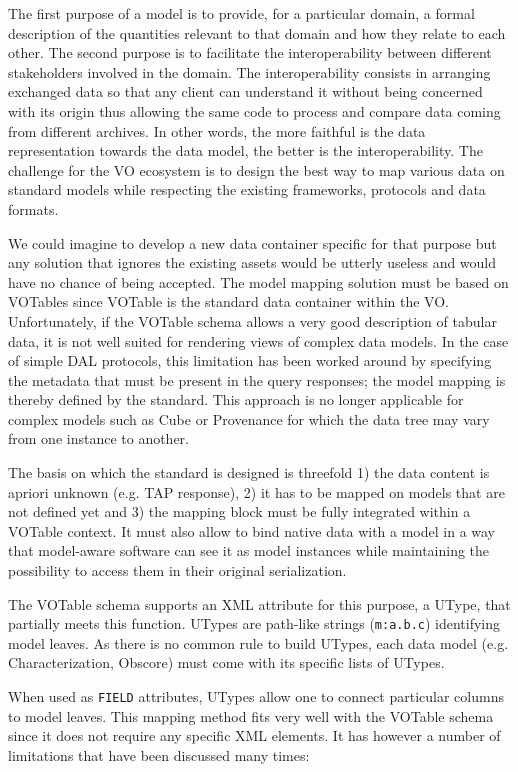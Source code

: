 
The first purpose of a model is to provide, for a particular domain, a formal description of the quantities relevant to that domain and how they relate to each other.
The second purpose is to facilitate the interoperability between  different stakeholders involved in the domain. The interoperability consists in arranging exchanged data 
so that any client can understand it without being concerned with its origin thus allowing the same code to process and compare data coming from different archives.  
In other words, the more faithful is the data representation towards the data model, the better is the interoperability.
The challenge for the VO ecosystem is to design the best way to map various data on standard models while respecting the existing frameworks, protocols and data formats.

We could imagine to develop a new data container specific for that purpose but any solution that ignores the existing assets would be utterly useless and would have no chance of being accepted.
The model mapping solution must be based on VOTables since VOTable  \citep{2019ivoa.spec.1021O} is the standard data container within the VO.
Unfortunately, if the VOTable schema allows a very good description of tabular data, it is not well suited for rendering views of complex data models.
In the case of simple DAL protocols, this limitation has been worked around by specifying the metadata that must be present in the query responses; the model mapping is thereby defined by the standard.
This approach is no longer applicable for complex models such as Cube or Provenance for which the data tree may vary from one instance to another.

The basis on which the standard is designed is threefold 1) the data content is apriori unknown (e.g. TAP response), 2) it has to be mapped on models that are not defined yet and 3) the mapping block must be fully integrated within a VOTable context.
It must also allow to bind native data with a model in a way that model-aware software can see it as model instances while maintaining the possibility to access them in their original serialization.

The VOTable schema supports an XML attribute for this purpose, a UType, that partially meets this function. 
UTypes are path-like strings (\texttt{m:a.b.c}) identifying model leaves. As there is no common rule to build UTypes,  each data model (e.g. Characterization, Obscore)  must come with its specific lists of UTypes. 

When used as \texttt{FIELD} attributes, UTypes allow one to connect particular columns to model leaves. This mapping method fits very well with the VOTable schema since it does not require any specific XML elements. It has however a number of limitations that have been discussed many times:

